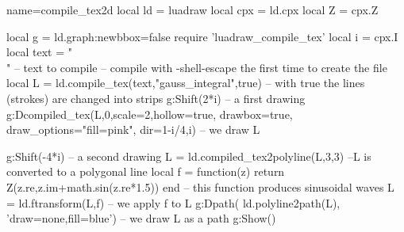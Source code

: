 \begin{luadraw}{name=compile_tex2d}
local ld = luadraw
local cpx = ld.cpx
local Z = cpx.Z

local g = ld.graph:new{bbox=false}
require 'luadraw_compile_tex'
local i = cpx.I
local text = "\\[\\int_0^{+\\infty} e^{-\\frac{x^2}2}dx = \\frac{\\sqrt{2\\pi}}2\\]" -- text to compile
-- compile with -shell-escape the first time to create the file
local L = ld.compile_tex(text,"gauss_integral",true) -- with true the lines (strokes) are changed into strips
g:Shift(2*i) -- a first drawing
g:Dcompiled_tex(L,0,{scale=2,hollow=true, drawbox=true, draw_options="fill=pink", dir={1-i/4,i}}) -- we draw L

g:Shift(-4*i) -- a second drawing
L = ld.compiled_tex2polyline(L,{3,3}) --L is converted to a polygonal line
local f = function(z) return Z(z.re,z.im+math.sin(z.re*1.5)) end  -- this function produces sinusoidal waves
L = ld.ftransform(L,f) -- we apply f to L
g:Dpath( ld.polyline2path(L), 'draw=none,fill=blue') -- we draw L as a path
g:Show()
\end{luadraw}
